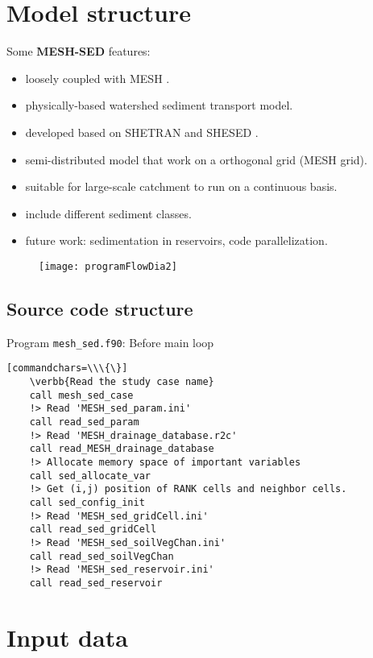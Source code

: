 \documentclass[12pt, letterpaper]{article}
\newcommand{\ms}{\textbf{MESH-SED} }
\newcommand\verbb[1]{\textcolor[rgb]{0,0,1}{#1}}
\begin{document}
\section{Model structure}
Some \ms features:
\begin{itemize}
\item loosely coupled with MESH \cite{pietroniro2006using}.
\item physically-based watershed sediment transport model.
\item developed based on SHETRAN \cite{ewen2000shetran} and SHESED \cite{wicks1996shesed}.
\item semi-distributed model that work on a orthogonal grid (MESH grid). 
\item suitable for large-scale catchment to run on a continuous basis.
\item include different sediment classes.
\item future work: sedimentation in reservoirs, code parallelization. 
\end{itemize}
\begin{figure}
\texttt{[image: programFlowDia2]}
\end{figure}

\subsection{Source code structure}
Program \texttt{mesh\_sed.f90}: Before main loop 
\begin{footnotesize}
\begin{verbatim}[commandchars=\\\{\}]
    \verbb{Read the study case name}
    call mesh_sed_case
    !> Read 'MESH_sed_param.ini'
    call read_sed_param
    !> Read 'MESH_drainage_database.r2c'
    call read_MESH_drainage_database
    !> Allocate memory space of important variables
    call sed_allocate_var
    !> Get (i,j) position of RANK cells and neighbor cells.
    call sed_config_init
    !> Read 'MESH_sed_gridCell.ini'
    call read_sed_gridCell
    !> Read 'MESH_sed_soilVegChan.ini'
    call read_sed_soilVegChan
    !> Read 'MESH_sed_reservoir.ini'
    call read_sed_reservoir
\end{verbatim}
\end{footnotesize}


\section{Input data}
\end{document}
